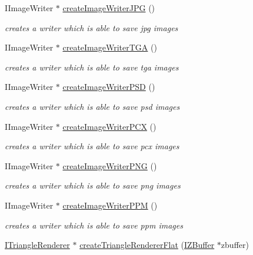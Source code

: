 \begin{DoxyCompactItemize}
I\-Image\-Writer $\ast$ \hyperlink{namespaceirr_1_1video_ae5213b21c347b737fbdf144e46a1e8ff}{create\-Image\-Writer\-J\-P\-G} ()
\begin{DoxyCompactList}\small\item\em creates a writer which is able to save jpg images \end{DoxyCompactList}\item 
I\-Image\-Writer $\ast$ \hyperlink{namespaceirr_1_1video_a1bb51e7a4329339b7071a081d3f4e087}{create\-Image\-Writer\-T\-G\-A} ()
\begin{DoxyCompactList}\small\item\em creates a writer which is able to save tga images \end{DoxyCompactList}\item 
I\-Image\-Writer $\ast$ \hyperlink{namespaceirr_1_1video_aeabd53e11071815b3efac1aecc0dc08e}{create\-Image\-Writer\-P\-S\-D} ()
\begin{DoxyCompactList}\small\item\em creates a writer which is able to save psd images \end{DoxyCompactList}\item 
I\-Image\-Writer $\ast$ \hyperlink{namespaceirr_1_1video_aaf2f34f1737f592fb1e3ab3354c549ca}{create\-Image\-Writer\-P\-C\-X} ()
\begin{DoxyCompactList}\small\item\em creates a writer which is able to save pcx images \end{DoxyCompactList}\item 
I\-Image\-Writer $\ast$ \hyperlink{namespaceirr_1_1video_a66855fe68d9a8390f7e0f93372f4cb63}{create\-Image\-Writer\-P\-N\-G} ()
\begin{DoxyCompactList}\small\item\em creates a writer which is able to save png images \end{DoxyCompactList}\item 
I\-Image\-Writer $\ast$ \hyperlink{namespaceirr_1_1video_a59da4a246ac15d1151901046680a5c2f}{create\-Image\-Writer\-P\-P\-M} ()
\begin{DoxyCompactList}\small\item\em creates a writer which is able to save ppm images \end{DoxyCompactList}\item 
\hyperlink{classirr_1_1video_1_1_i_triangle_renderer}{I\-Triangle\-Renderer} $\ast$ \hyperlink{namespaceirr_1_1video_a75ffbde779d2faff7fa1b2c305550bcb}{create\-Triangle\-Renderer\-Flat} (\hyperlink{classirr_1_1video_1_1_i_z_buffer}{I\-Z\-Buffer} $\ast$zbuffer)

\end{DoxyCompactItemize}
